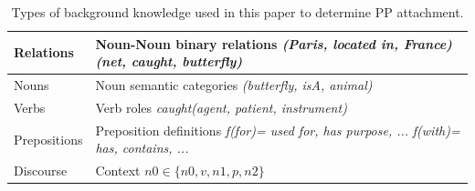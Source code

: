                      \begin{table}[h]
                              \centering
                              \small{
                                       \begin{tabular}{|p{1.8cm}|p{4.9cm}|}
                                         \hline
                                         Relations &  Noun-Noun binary relations  \newline \textit{ (Paris, located in, France)} \newline \textit{(net, caught, butterfly)}\\
                                         \hline
                                         Nouns &  Noun semantic categories \newline \textit{(butterfly, isA, animal)}  \\
                                         \hline
                                         Verbs & Verb roles \newline  \textit{caught(agent, patient, instrument)} \\
                                         \hline
                                         Prepositions& Preposition  definitions \newline  
                                         \textit{ f(for)= used for, has purpose, ...}  
                                         \newline \textit{f(with)= has, contains, ...}  \\
                                         \hline
                                         Discourse &  Context \newline  $n0 \in \{n0, v, n1, p, n2\}$\\
                                         \hline
                                       \end{tabular}
                                       \caption{Types of background   
                                       knowledge used in this paper to determine PP attachment.}
                                         \label{tab:knowledge}
                                         }      
                                       \end{table}     
        
